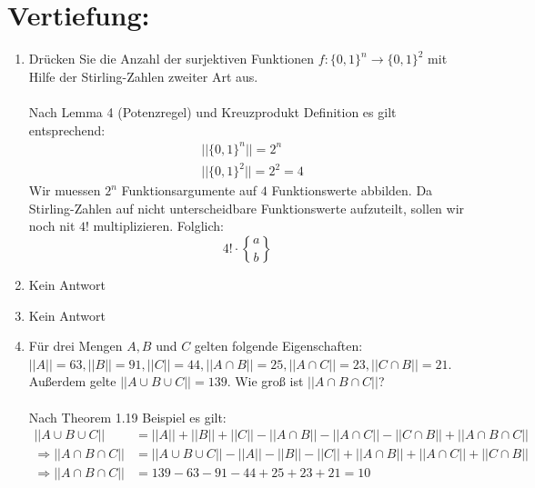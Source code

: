 

\DeclareRobustCommand{\stirling}{\genfrac\{\}{0pt}{}}

    \maketitle
    \section*{Vertiefung:}
    \begin{enumerate}[label=(\alph*)]
        \item Drücken Sie die Anzahl der surjektiven Funktionen 
        $f : \{0, 1\}^n \to \{0, 1\}^2$ mit Hilfe der Stirling-Zahlen zweiter Art aus.\\\\
        Nach Lemma 4 (Potenzregel) und Kreuzprodukt Definition es gilt entsprechend:
        \begin{align*}
	        &||\{0, 1\}^n|| = 2^n \\
	        &|| \{0, 1\}^2|| = 2^2 = 4
	    \end{align*}
	    Wir muessen $2^n$ Funktionsargumente auf $4$ Funktionswerte abbilden. Da Stirling-Zahlen auf 
	    nicht unterscheidbare Funktionswerte aufzuteilt, sollen wir noch nit $4!$ multiplizieren.  
	    Folglich: \[4!\cdot\stirling{a}{b}\]

        \item Kein Antwort

        \item Kein Antwort

        \item Für drei Mengen $A, B$ und $C$ gelten folgende Eigenschaften: 
        $||A|| = 63, ||B|| = 91, ||C|| = 44, ||A\cap B|| = 25, ||A\cap C|| = 23, ||C \cap B|| = 21$. 
        Außerdem gelte $||A\cup B\cup C|| = 139$. Wie groß ist $||A \cap B \cap C||$?\\\\
        Nach Theorem 1.19 Beispiel es gilt:
        \begin{align*}
	        ||A\cup B\cup C|| &= ||A||+||B||+||C||-||A\cap B||-||A\cap C||-||C \cap B||+||A \cap B \cap C||\\
	        \Rightarrow ||A \cap B \cap C|| &= ||A\cup B\cup C||-||A||-||B||-||C||+||A\cap B||+||A\cap C||+||C \cap B||\\
	        \Rightarrow ||A \cap B \cap C|| &= 139 - 63 - 91 - 44 + 25 + 23 + 21 = 10 \\
        \end{align*}
    \end{enumerate}
